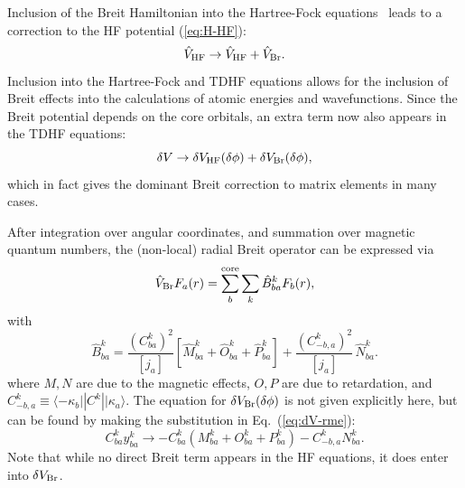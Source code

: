 \documentclass[10pt,twocolumn,a4paper]{article}%
\newcommand{\bra}[1]{\ensuremath{\langle #1|}}	%
\newcommand{\ket}[1]{\ensuremath{|#1\rangle}}	%
\newcommand{\be}{\begin{equation}}
\newcommand{\ee}{\end{equation}}
\renewcommand{\k}{\ensuremath{\kappa}}
\begin{document}
Inclusion of the Breit Hamiltonian into the Hartree-Fock equations~\cite{Derevianko2001} leads to a correction to the HF potential (\ref{eq:H-HF}):
\be
\hat V_{\rm HF} \to  \hat V_{\rm HF}  + \hat V_{\rm Br} .
\ee
Inclusion into the Hartree-Fock and TDHF equations allows for the inclusion of Breit effects into the calculations of atomic energies and wavefunctions.
Since the Breit potential depends on the core orbitals, an extra term now also appears in the TDHF equations: 
\be
\delta V\to \delta V_{\rm HF}(\delta\phi)+\delta V_{\rm Br}(\delta\phi),
\ee
which in fact gives the dominant Breit correction to matrix elements in many cases.


After integration over angular coordinates, and summation over magnetic quantum numbers, the (non-local) radial Breit operator can be expressed via
\be\label{eq:HF_Breit}
\hat V_{\rm Br} F_a(r) = \sum_b^{\rm core}\sum_k \hat B^k_{ba}F_b(r),
\ee
with
\begin{equation}
\hat B^k_{ba} =   \frac{(C^k_{ba})^2 }{[j_a]}  \left[\hat M^k_{ba} + \hat O^k_{ba} + \hat P^k_{ba}\right]
 +
 \frac{(C^k_{-b,a})^2}{[j_a]} \, \hat N^k_{ba}.
\end{equation}
where
$M,N$ are due to the magnetic effects, $O,P$ are due to retardation, and
 $C^k_{-b,a} \equiv \bra{-\k_b}|C^k|\ket{\k_a}$. 
The equation for $\delta V_{\rm Br}(\delta\phi)$ is not given explicitly here, 
but can be found by making the substitution in Eq.~(\ref{eq:dV-rme}):
\[
C^k_{ba}y^k_{ba}\to -C^k_{ba}(M_{ba}^k+O_{ba}^k+P_{ba}^k)  -C^k_{-b,a}N_{ba}^k.
\]
Note that while no direct Breit term appears in the HF equations, it does enter into $\delta V_{\rm Br}$.
\end{document}
